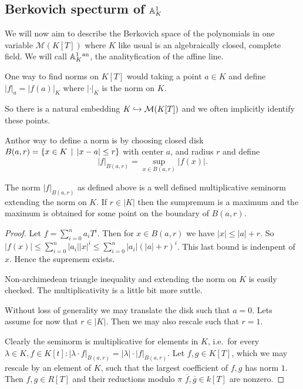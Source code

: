 \subsection{Berkovich specturm of $\mathbb{A}^{1}_K$} \label{sec:berkovich_specturm_of_affine_line}

We will now aim to describe the Berkovich space of the polynomials in one variable  $\mathcal{M} (K[T])$ where $K$ like usual is an algebraically closed, complete field. 
We will call $\mathbb{A}_K^{1}{}^{\text{an}}$, the analityfication of the affine line. 

One way to find norms on $K[T]$ would taking a point $a \in K$ and define $|f|_a = |f(a)|_K$ where $|\cdot |_K$ is the norm on $K$. 

So there is a natural embedding $K \hookrightarrow \mathcal{M}(K[T])$ and we often implicitly identify these points.  

Anthor way to define a norm is by choosing closed disk $B(a, r) = \{x \in K \st |x - a| \le r\} $ with center $a$, and radius $r$ and define \[
	|f|_{B(a, r)} = \sup_{x \in B(a, r)} |f(x)|
.\] 
\begin{claim}
	The norm $|f|_{B(a, r)}$ as defined above is a well defined multiplicative seminorm extending the norm on $K$. 
	If $r \in |K|$ then the sumpremum is a maximum and the maximum is obtained for some point on the boundary of $B(a, r)$.
\end{claim}
\begin{proof}
	Let $f = \sum_{i = 0}^{n} a_i T^{i}$. 
	Then for $x \in B(a, r)$ we have $|x| \le |a| + r$. 
	So  $|f(x)| \le  \sum_{i = 0}^{n} |a_i| |x|^{i} \le \sum_{i = 0}^{n}|a_i| (|a| + r)^{i} $. 
	This last bound is indenpent of $x$. Hence the supremem exists. 

	Non-archimedean triangle inequality and extending the norm on $K$ is easily checked. 
	The multiplicativity is a little bit more suttle. 

	Without loss of generality we may translate the disk such that $a = 0$. 
	Lets assume for now that $r \in |K|$.
	Then we may also rescale such that $r = 1$. 

	Clearly the seminorm is multiplicative for elements in  $K$, i.e.\ for every $\lambda \in K, f \in K[t]: |\lambda \cdot f|_{B(a, r)} = |\lambda|\cdot |f|_{B(a, r)}$.  Let $f, g \in K[T]$, which we may rescale by an element of $K$, such that the largest coefficient of $f, g$ has norm $1$. 
	Then $f, g \in R[T]$ and their  reductions modulo  $\pi$ $\overline{f}, \overline{g} \in k[T]$ are nonzero.
\end{proof}

